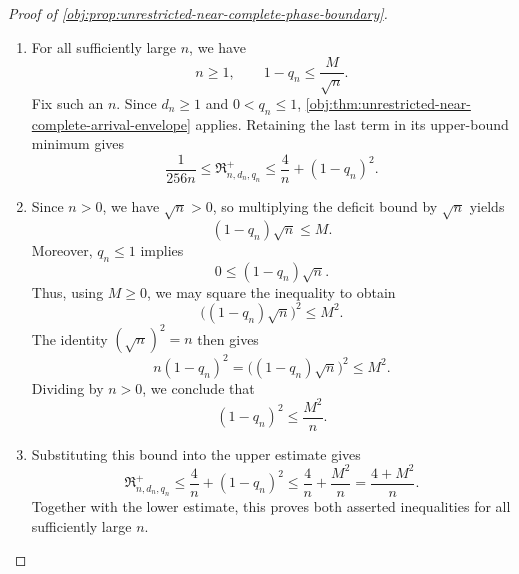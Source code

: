 \begin{proof}[Proof of \cref{obj:prop:unrestricted-near-complete-phase-boundary}]
\begin{enumerate}
\item For all sufficiently large \(n\), we have
\[
n\ge1,
\qquad
1-q_n\le\frac{M}{\sqrt n}.
\]
Fix such an \(n\). Since \(d_n\ge1\) and \(0<q_n\le1\), \cref{obj:thm:unrestricted-near-complete-arrival-envelope} applies. Retaining the last term in its upper-bound minimum gives
\[
\frac{1}{256n}
\le \mathfrak R^{+}_{n,d_n,q_n}
\le \frac4n+(1-q_n)^2.
\]

\item Since \(n>0\), we have \(\sqrt n>0\), so multiplying the deficit bound by \(\sqrt n\) yields
\[
(1-q_n)\sqrt n\le M.
\]
Moreover, \(q_n\le1\) implies
\[
0\le(1-q_n)\sqrt n.
\]
Thus, using \(M\ge0\), we may square the inequality to obtain
\[
\bigl((1-q_n)\sqrt n\bigr)^2\le M^2.
\]
The identity \((\sqrt n)^2=n\) then gives
\[
n(1-q_n)^2
=
\bigl((1-q_n)\sqrt n\bigr)^2
\le M^2.
\]
Dividing by \(n>0\), we conclude that
\[
(1-q_n)^2\le\frac{M^2}{n}.
\]

\item Substituting this bound into the upper estimate gives
\[
\mathfrak R^{+}_{n,d_n,q_n}
\le \frac4n+(1-q_n)^2
\le \frac4n+\frac{M^2}{n}
=\frac{4+M^2}{n}.
\]
Together with the lower estimate, this proves both asserted inequalities for all sufficiently large \(n\).
\end{enumerate}
\end{proof}

